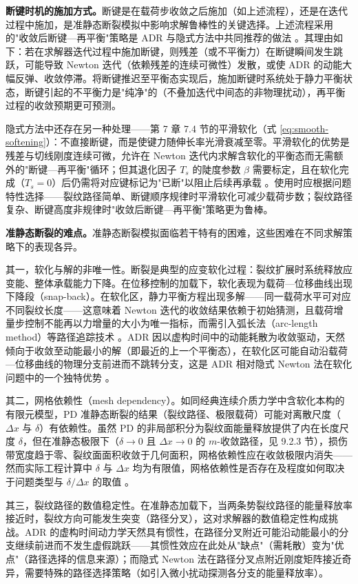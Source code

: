 \textbf{断键时机的施加方式。}断键是在载荷步收敛之后施加（如上述流程），还是在迭代过程中施加，是准静态断裂模拟中影响求解鲁棒性的关键选择。上述流程采用的"收敛后断键—再平衡"策略是 ADR 与隐式方法中共同推荐的做法 \cite{KilicMadenci2010,Ni2019,Hashim2020}。其理由如下：若在求解器迭代过程中施加断键，则残差（或不平衡力）在断键瞬间发生跳跃，可能导致 Newton 迭代（依赖残差的连续可微性）发散，或使 ADR 的动能大幅反弹、收敛停滞。将断键推迟至平衡态实现后，施加断键时系统处于静力平衡状态，断键引起的不平衡力是"纯净"的（不叠加迭代中间态的非物理扰动），再平衡过程的收敛预期更可预测。

隐式方法中还存在另一种处理——第 7 章 7.4 节的平滑软化（式 \eqref{eq:smooth-softening}）：不直接断键，而是使键力随伸长率光滑衰减至零。平滑软化的优势是残差与切线刚度连续可微，允许在 Newton 迭代内求解含软化的平衡态而无需额外的"断键—再平衡"循环；但其退化因子 $T_s$ 的陡度参数 $\beta$ 需要标定，且在软化完成（$T_s=0$）后仍需将对应键标记为"已断"以阻止后续再承载 \cite{Hashim2020}。使用时应根据问题特性选择——裂纹路径简单、断键顺序规律时平滑软化可减少载荷步数；裂纹路径复杂、断键高度非规律时"收敛后断键—再平衡"策略更为鲁棒。

\textbf{准静态断裂的难点。}准静态断裂模拟面临若干特有的困难，这些困难在不同求解策略下的表现各异。

其一，软化与解的非唯一性。断裂是典型的应变软化过程：裂纹扩展时系统释放应变能、整体承载能力下降。在位移控制的加载下，软化表现为载荷—位移曲线出现下降段（snap-back）。在软化区，静力平衡方程出现多解——同一载荷水平可对应不同裂纹长度——这意味着 Newton 迭代的收敛结果依赖于初始猜测，且载荷增量步控制不能再以力增量的大小为唯一指标，而需引入弧长法（arc-length method）等路径追踪技术 \cite{Ni2019}。ADR 因以虚构时间中的动能耗散为收敛驱动，天然倾向于收敛至动能最小的解（即最近的上一个平衡态），在软化区可能自动沿载荷—位移曲线的物理分支前进而不跳转分支，这是 ADR 相对隐式 Newton 法在软化问题中的一个独特优势 \cite{KilicMadenci2010}。

其二，网格依赖性（mesh dependency）。如同经典连续介质力学中含软化本构的有限元模型，PD 准静态断裂的结果（裂纹路径、极限载荷）可能对离散尺度（$\Delta x$ 与 $\delta$）有依赖性。虽然 PD 的非局部积分为裂纹面能量释放提供了内在长度尺度 $\delta$，但在准静态极限下（$\delta\to0$ 且 $\Delta x\to0$ 的 $m$-收敛路径，见 9.2.3 节），损伤带宽度趋于零、裂纹面面积收敛于几何面积，网格依赖性应在收敛极限内消失——然而实际工程计算中 $\delta$ 与 $\Delta x$ 均为有限值，网格依赖性是否存在及程度如何取决于问题类型与 $\delta/\Delta x$ 的取值 \cite{HaBobaru2010,Diehl2019}。

其三，裂纹路径的数值稳定性。在准静态加载下，当两条势裂纹路径的能量释放率接近时，裂纹方向可能发生突变（路径分叉），这对求解器的数值稳定性构成挑战。ADR 的虚构时间动力学天然具有惯性，在路径分叉附近可能沿动能最小的分支继续前进而不发生虚假跳跃——其惯性效应在此处从"缺点"（需耗散）变为"优点"（路径选择的信息来源）；而隐式 Newton 法在路径分叉点附近刚度矩阵接近奇异，需要特殊的路径选择策略（如引入微小扰动探测各分支的能量释放率）\cite{Ni2019,HaBobaru2010}。

